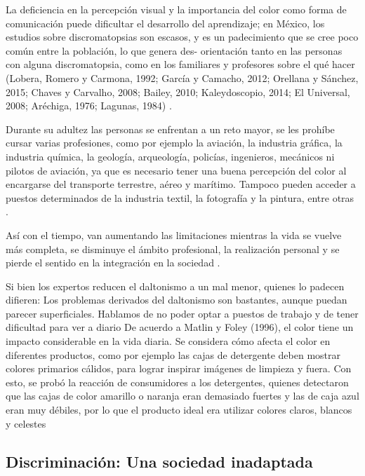 \documentclass[10pt]{article}
\begin{document}
La deficiencia en la percepción visual y la importancia del color como forma de comunicación puede dificultar el desarrollo del aprendizaje; en México, los estudios sobre discromatopsias son escasos, y es un padecimiento que se cree poco común entre la población, lo que genera des- orientación tanto en las personas con alguna discromatopsia, como en los familiares y profesores sobre el qué hacer (Lobera, Romero y Carmona, 1992; García y Camacho, 2012; Orellana y Sánchez, 2015; Chaves y Carvalho, 2008; Bailey, 2010; Kaleydoscopio, 2014; El Universal, 2008; Aréchiga, 1976; Lagunas, 1984) \cite{IEEEreferencias:Ref27}.

Durante su adultez las personas se enfrentan a un reto mayor, se les prohíbe cursar varias profesiones, como por ejemplo la aviación, la industria gráfica, la industria química, la geología, arqueología, policías, ingenieros, mecánicos ni pilotos de aviación, ya que es necesario tener una buena percepción del color al encargarse del transporte terrestre, aéreo y marítimo. Tampoco pueden acceder a puestos determinados de la industria textil, la fotografía y la pintura, entre otras \cite{IEEEreferencias:Ref32}\cite{IEEEreferencias:Ref1}.

Así con el tiempo, van aumentando las limitaciones mientras la vida se vuelve más completa, se disminuye el ámbito profesional, la realización personal y se pierde el sentido en la integración en la sociedad \cite{IEEEreferencias:Ref32}.

Si bien los expertos reducen el daltonismo a un mal menor, quienes lo padecen difieren: Los problemas derivados del daltonismo son bastantes, aunque puedan parecer superficiales. Hablamos de no poder optar a puestos de trabajo y de tener dificultad para ver a diario \cite{IEEEreferencias:Ref1}
De acuerdo a Matlin y Foley (1996), el color tiene un impacto considerable en la vida diaria. Se considera cómo afecta el color en diferentes productos, como por ejemplo las cajas de detergente deben mostrar colores primarios cálidos, para lograr inspirar imágenes de limpieza y fuera. Con esto, se probó la reacción de consumidores a los detergentes, quienes detectaron que las cajas de color amarillo o naranja eran demasiado fuertes y las de caja azul eran muy débiles, por lo que el producto ideal era utilizar colores claros, blancos y celestes \cite{IEEEreferencias:Ref32}

\subsection{Discriminación: Una sociedad inadaptada}
\end{document}
